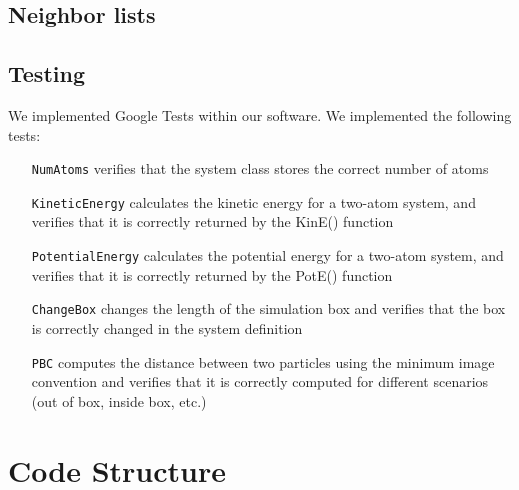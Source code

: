 \documentclass[12pt]{article}
\begin{document}
\subsection{Neighbor lists}

\subsection{Testing}

We implemented Google Tests within our software.
%
We implemented the following tests:
	\begin{itemize}
	\item[\texttt{NumAtoms}] verifies that the system class stores the correct number of atoms
	\item[\texttt{KineticEnergy}] calculates the kinetic energy for a two-atom system, and verifies that it is correctly returned by the KinE() function
	\item[\texttt{PotentialEnergy}] calculates the potential energy for a two-atom system, and verifies that it is correctly returned by the PotE() function
	\item[\texttt{ChangeBox}] changes the length of the simulation box and verifies that the box is correctly changed in the system definition
	\item[\texttt{PBC}] computes the distance between two particles using the minimum image convention and verifies that it is correctly computed for different scenarios (out of box, inside box, etc.)
	\end{itemize}
\section{Code Structure}
\end{document}
